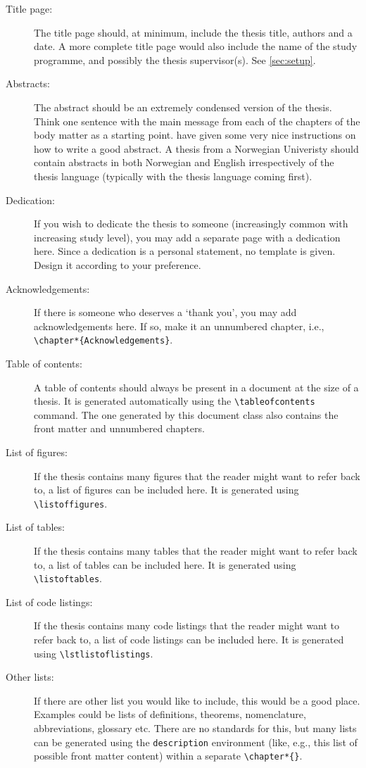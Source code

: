 \begin{description}
    \item[Title page:] The title page should, at minimum, include the thesis title, authors and a date. A more complete title page would also include the name of the study programme, and possibly the thesis supervisor(s). See \cref{sec:setup}.
    \item[Abstracts:] The abstract should be an extremely condensed version of the thesis. Think one sentence with the main message from each of the chapters of the body matter as a starting point. \textcite{landes1951scrutiny} have given some very nice instructions on how to write a good abstract. A thesis from a Norwegian Univeristy should contain abstracts in both Norwegian and English irrespectively of the thesis language (typically with the thesis language coming first).
    \item[Dedication:] If you wish to dedicate the thesis to someone (increasingly common with increasing study level), you may add a separate page with a dedication here. Since a dedication is a personal statement, no template is given. Design it according to your preference.
    \item[Acknowledgements:] If there is someone who deserves a `thank you', you may add acknowledgements here. If so, make it an unnumbered chapter, i.e., \texttt{\textbackslash chapter*\{Acknowledgements\}}.
    \item[Table of contents:] A table of contents should always be present in a document at the size of a thesis. It is generated automatically using the \texttt{\textbackslash tableofcontents} command. The one generated by this document class also contains the front matter and unnumbered chapters.
    \item[List of figures:] If the thesis contains many figures that the reader might want to refer back to, a list of figures can be included here. It is generated using \texttt{\textbackslash listoffigures}.
    \item[List of tables:] If the thesis contains many tables that the reader might want to refer back to, a list of tables can be included here. It is generated using \texttt{\textbackslash listoftables}.
    \item[List of code listings:] If the thesis contains many code listings that the reader might want to refer back to, a list of code listings can be included here. It is generated using \texttt{\textbackslash lstlistoflistings}.
    \item[Other lists:] If there are other list you would like to include, this would be a good place. Examples could be lists of definitions, theorems, nomenclature, abbreviations, glossary etc. There are no standards for this, but many lists can be generated using the \texttt{description} environment (like, e.g., this list of possible front matter content) within a separate \texttt{\textbackslash chapter*\{\}}.

\end{description}
